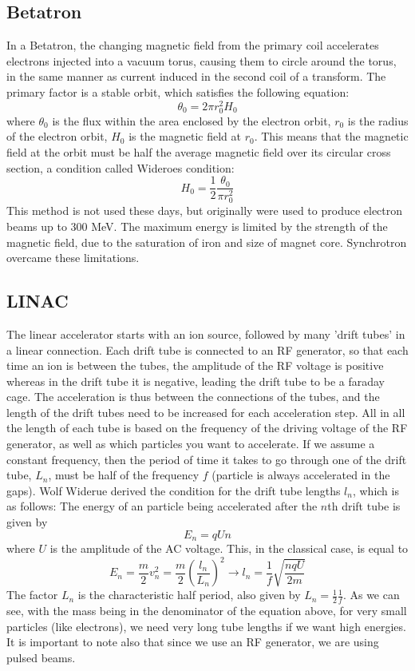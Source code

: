 \subsection{Betatron}\label{subsec:betatron}
In a Betatron, the changing magnetic field from the primary coil accelerates electrons injected into a vacuum torus, causing them to circle around the torus, in the same manner as current induced in the second coil of a transform.
The primary factor is a stable orbit, which satisfies the following equation:
\[\theta_0 = 2\pi r_0^2 H_0\]
where $\theta_0$ is the flux within the area enclosed by the electron orbit, $r_0$ is the radius of the electron orbit, $H_0$ is the magnetic field at $r_0$.
This means that the magnetic field at the orbit must be half the average magnetic field over its circular cross section, a condition called Wideroes condition:
\[ H_0 = \frac{1}{2}\frac{\theta_0}{\pi r_0^2} \]
This method is not used these days, but originally were used to produce electron beams up to 300 MeV.
The maximum energy is limited by the strength of the magnetic field, due to the saturation of iron and size of magnet core.
Synchrotron overcame these limitations.

\subsection{LINAC}\label{subsec:linac}
The linear accelerator starts with an ion source, followed by many 'drift tubes' in a linear connection.
Each drift tube is connected to an RF generator, so that each time an ion is between the tubes, the amplitude of the RF voltage is positive whereas in the drift tube it is negative, leading the drift tube to be a faraday cage.
The acceleration is thus between the connections of the tubes, and the length of the drift tubes need to be increased for each acceleration step.
All in all the length of each tube is based on the frequency of the driving voltage of the RF generator, as well as which particles you want to accelerate.
If we assume a constant frequency, then the period of time it takes to go through one of the drift tube, $L_n$, must be half of the frequency $f$ (particle is always accelerated in the gaps).
Wolf Widerue derived the condition for the drift tube lengths $l_n$, which is as follows: The energy of an particle being accelerated after the $n$th drift tube is given by
$$ E_n = qUn $$
where $U$ is the amplitude of the AC voltage.
This, in the classical case, is equal to
\[ E_n = \frac{m}{2}v_n^2 = \frac{m}{2} \left(\frac{l_n}{L_n}\right)^2 \rightarrow l_n = \frac{1}{f}\sqrt{\frac{nqU}{2m}} \]
The factor $L_n$ is the characteristic half period, also given by $L_n=\frac{1}{2}\frac{1}{f}$.
As we can see, with the mass being in the denominator of the equation above, for very small particles (like electrons), we need very long tube lengths if we want high energies.
It is important to note also that since we use an RF generator, we are using pulsed beams.


